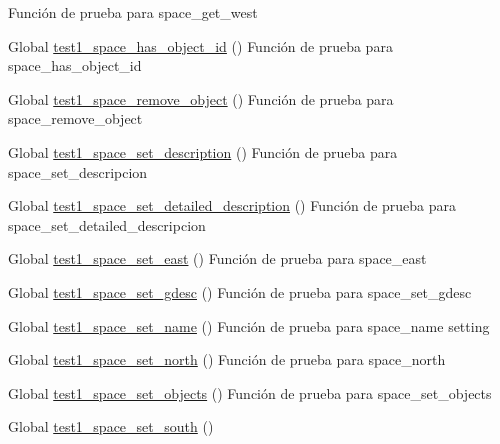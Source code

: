 \begin{DoxyRefList}
%
Función de prueba para space\+\_\+get\+\_\+west  
\item[Global \mbox{\hyperlink{space__test_8c_a4b892f7edf25e12eb9667ab34c325bf5}{test1\+\_\+space\+\_\+has\+\_\+object\+\_\+id}} ()]\label{test__test000251}%
%
Función de prueba para space\+\_\+has\+\_\+object\+\_\+id  
\item[Global \mbox{\hyperlink{space__test_8c_a8edeba07aa351da3c1b4bdf4a18c2f7b}{test1\+\_\+space\+\_\+remove\+\_\+object}} ()]\label{test__test000249}%
%
Función de prueba para space\+\_\+remove\+\_\+object  
\item[Global \mbox{\hyperlink{space__test_8c_a19a1bac3ab9cc6f5bf7ea8c4a72392c4}{test1\+\_\+space\+\_\+set\+\_\+description}} ()]\label{test__test000258}%
%
Función de prueba para space\+\_\+set\+\_\+descripcion  
\item[Global \mbox{\hyperlink{space__test_8c_a0a3024e47d0354245b76a9728730a998}{test1\+\_\+space\+\_\+set\+\_\+detailed\+\_\+description}} ()]\label{test__test000263}%
%
Función de prueba para space\+\_\+set\+\_\+detailed\+\_\+descripcion  
\item[Global \mbox{\hyperlink{space__test_8c_ab1f093af4be3ca8e525d0517cc846f47}{test1\+\_\+space\+\_\+set\+\_\+east}} ()]\label{test__test000229}%
%
Función de prueba para space\+\_\+east  
\item[Global \mbox{\hyperlink{space__test_8c_a068c22b91236896ae1b077a8f7059458}{test1\+\_\+space\+\_\+set\+\_\+gdesc}} ()]\label{test__test000254}%
%
Función de prueba para space\+\_\+set\+\_\+gdesc  
\item[Global \mbox{\hyperlink{space__test_8c_a2569bab6cfeec15f722d232bb8c78c9e}{test1\+\_\+space\+\_\+set\+\_\+name}} ()]\label{test__test000222}%
%
Función de prueba para space\+\_\+name setting  
\item[Global \mbox{\hyperlink{space__test_8c_a3d3457a89f705948102cf1e5d4a7b45b}{test1\+\_\+space\+\_\+set\+\_\+north}} ()]\label{test__test000225}%
%
Función de prueba para space\+\_\+north  
\item[Global \mbox{\hyperlink{space__test_8c_a1a1bd45a600ed16e6b3b43e08f768afc}{test1\+\_\+space\+\_\+set\+\_\+objects}} ()]\label{test__test000235}%
%
Función de prueba para space\+\_\+set\+\_\+objects  
\item[Global \mbox{\hyperlink{space__test_8c_a21938e16547b3080e9251f960117a859}{test1\+\_\+space\+\_\+set\+\_\+south}} ()]\label{test__test000227}%

\end{DoxyRefList}
